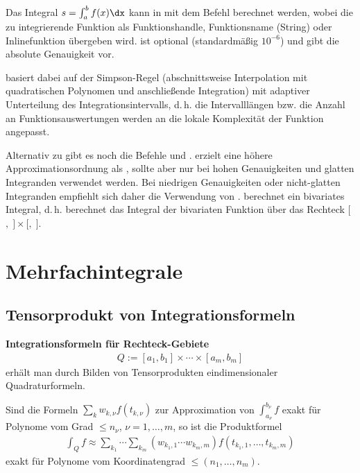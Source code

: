 Das Integral $s = \int_a^b f(x)\dx$ kann in \matlab{} mit dem Befehl
 berechnet werden,
wobei die zu integrierende Funktion  als Funktionshandle, Funktionsname
(String) oder Inlinefunktion übergeben wird.
 ist optional (standardmäßig $10^{-6}$) und gibt die absolute
Genauigkeit vor.

 basiert dabei auf der Simpson-Regel
(abschnittsweise Interpolation mit quadratischen Polynomen und anschließende
Integration) mit adaptiver Unterteilung des Integrationsintervalls, d.\,h.
die Intervalllängen bzw. die Anzahl an Funktionsauswertungen werden an
die lokale Komplexität der Funktion angepasst.

Alternativ zu  gibt es noch die Befehle  und
.
 erzielt eine höhere Approximationsordnung als ,
sollte aber nur bei hohen Genauigkeiten und glatten Integranden verwendet
werden.
Bei niedrigen Genauigkeiten oder nicht-glatten Integranden empfiehlt sich daher
die Verwendung von .
 berechnet ein bivariates Integral, d.\,h.
 berechnet
das Integral der bivariaten Funktion  über das Rechteck
$[$$,\;$$] \times [$$,\;$$]$.

\pagebreak

\section{%
    Mehrfachintegrale%
}

\subsection{%
    Tensorprodukt von Integrationsformeln%
}

\textbf{Integrationsformeln für Rechteck-Gebiete}
\begin{align*}
    Q := [a_1, b_1] \times \dotsb \times [a_m, b_m]
\end{align*}
erhält man durch Bilden von Tensorprodukten eindimensionaler Quadraturformeln.

Sind die Formeln $\sum_k w_{k,\nu} f(t_{k,\nu})$ zur Approximation von
$\int_{a_\nu}^{b_\nu} f$ exakt für Polynome vom Grad $\le n_\nu$,
$\nu = 1, \dotsc, m$, so ist die Produktformel
\begin{align*}
    \int_Q f \approx
    \sum_{k_1} \dotsb \sum_{k_m} (w_{k_1,1} \dotsb w_{k_m,m})
    f(t_{k_1,1}, \dotsc, t_{k_m,m})
\end{align*}
exakt für Polynome vom Koordinatengrad $\le (n_1, \dotsc, n_m)$.

